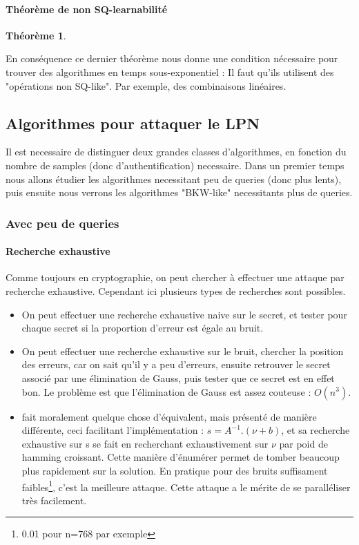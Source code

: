 \documentclass{article}		%
\theoremstyle{definition}
\newtheorem{theo}{Théorème}
\theoremstyle{plain}
\begin{document}
\paragraph{Théorème de non SQ-learnabilité}
\begin{theo}
\end{theo}
En conséquence ce dernier théorème nous donne une condition nécessaire
pour trouver des algorithmes en temps sous-exponentiel : Il faut qu'ils
utilisent des "opérations non SQ-like". Par exemple, des combinaisons
linéaires.

\subsection{Algorithmes pour attaquer le LPN}
Il est necessaire de distinguer deux grandes classes
d'algorithmes, en fonction du nombre de samples (donc d'authentification)
necessaire. Dans un premier temps nous allons étudier les algorithmes
necessitant peu de queries (donc plus lents), puis ensuite nous verrons
les algorithmes "BKW-like" necessitants plus de queries.


\subsubsection{Avec peu de queries}
\paragraph{Recherche exhaustive}
Comme toujours en cryptographie, on peut chercher à effectuer une attaque
par recherche exhaustive. Cependant ici plusieurs types de recherches sont
possibles.
\begin{itemize}
\item On peut effectuer une recherche exhaustive naive sur le
secret, et tester pour chaque secret si la proportion d'erreur est égale
au bruit.
\item On peut effectuer une recherche exhaustive sur le bruit, chercher
la position des erreurs, car on sait qu'il y a peu d'erreurs, ensuite
retrouver le secret associé par une élimination de Gauss, puis tester que
ce secret est en effet bon. Le problème est que l'élimination de Gauss
est assez couteuse : $O(n^3)$.
\item \cite{Gol} fait moralement quelque chose d'équivalent, mais
présenté de manière différente, ceci facilitant l'implémentation :
$s=A^{-1}.(\nu+b)$, et sa recherche
exhaustive sur s se fait en recherchant exhaustivement sur $\nu$ par poid
de hamming croissant. Cette manière d'énumérer permet de tomber beaucoup
plus rapidement sur la solution. En pratique pour des bruits suffisament
faibles\footnote{0.01 pour n=768 par exemple}, c'est la meilleure attaque. Cette attaque a
le mérite de se paralléliser très facilement. 
\end{itemize} 
\end{document}
